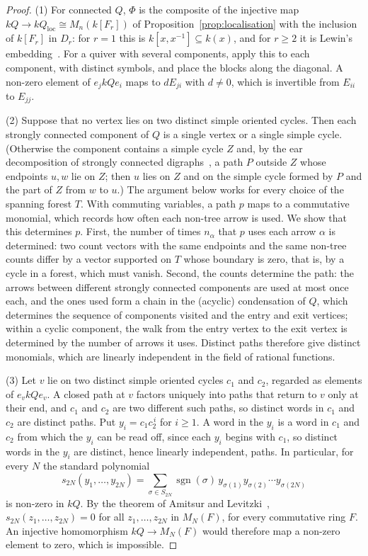 \documentclass[12pt, a4paper]{report}
\theoremstyle{plain}
\theoremstyle{definition}
\theoremstyle{remark}
\theoremstyle{plain}
\begin{document}
\begin{proof}
(1) For connected $Q$, $\Phi$ is the composite of the injective map $kQ\to kQ_{\mathrm{loc}}\cong M_n(k[F_r])$ of Proposition~\ref{prop:localisation} with the inclusion of $k[F_r]$ in $D_r$: for $r=1$ this is $k[x,x^{-1}]\subseteq k(x)$, and for $r\geq2$ it is Lewin's embedding~\cite{Lewin1974}. For a quiver with several components, apply this to each component, with distinct symbols, and place the blocks along the diagonal. A non-zero element of $e_jkQe_i$ maps to $dE_{ji}$ with $d\neq0$, which is invertible from $E_{ii}$ to $E_{jj}$.

(2) Suppose that no vertex lies on two distinct simple oriented cycles. Then each strongly connected component of $Q$ is a single vertex or a single simple cycle. (Otherwise the component contains a simple cycle $Z$ and, by the ear decomposition of strongly connected digraphs~\cite{BangJensenGutin2009}, a path $P$ outside $Z$ whose endpoints $u,w$ lie on $Z$; then $u$ lies on $Z$ and on the simple cycle formed by $P$ and the part of $Z$ from $w$ to $u$.) The argument below works for every choice of the spanning forest $T$. With commuting variables, a path $p$ maps to a commutative monomial, which records how often each non-tree arrow is used. We show that this determines $p$. First, the number of times $n_\alpha$ that $p$ uses each arrow $\alpha$ is determined: two count vectors with the same endpoints and the same non-tree counts differ by a vector supported on $T$ whose boundary is zero, that is, by a cycle in a forest, which must vanish. Second, the counts determine the path: the arrows between different strongly connected components are used at most once each, and the ones used form a chain in the (acyclic) condensation of $Q$, which determines the sequence of components visited and the entry and exit vertices; within a cyclic component, the walk from the entry vertex to the exit vertex is determined by the number of arrows it uses. Distinct paths therefore give distinct monomials, which are linearly independent in the field of rational functions.

(3) Let $v$ lie on two distinct simple oriented cycles $c_1$ and $c_2$, regarded as elements of $e_vkQe_v$. A closed path at $v$ factors uniquely into paths that return to $v$ only at their end, and $c_1$ and $c_2$ are two different such paths, so distinct words in $c_1$ and $c_2$ are distinct paths. Put $y_i=c_1c_2^{\,i}$ for $i\geq1$. A word in the $y_i$ is a word in $c_1$ and $c_2$ from which the $y_i$ can be read off, since each $y_i$ begins with $c_1$, so distinct words in the $y_i$ are distinct, hence linearly independent, paths. In particular, for every $N$ the standard polynomial
\[ s_{2N}(y_1,\dots,y_{2N})=\sum_{\sigma\in S_{2N}}\operatorname{sgn}(\sigma)\,y_{\sigma(1)}y_{\sigma(2)}\cdots y_{\sigma(2N)} \]
is non-zero in $kQ$. By the theorem of Amitsur and Levitzki~\cite{AmitsurLevitzki1950}, $s_{2N}(z_1,\dots,z_{2N})=0$ for all $z_1,\dots,z_{2N}$ in $M_N(F)$, for every commutative ring $F$. An injective homomorphism $kQ\to M_N(F)$ would therefore map a non-zero element to zero, which is impossible.
\end{proof}
\end{document}
